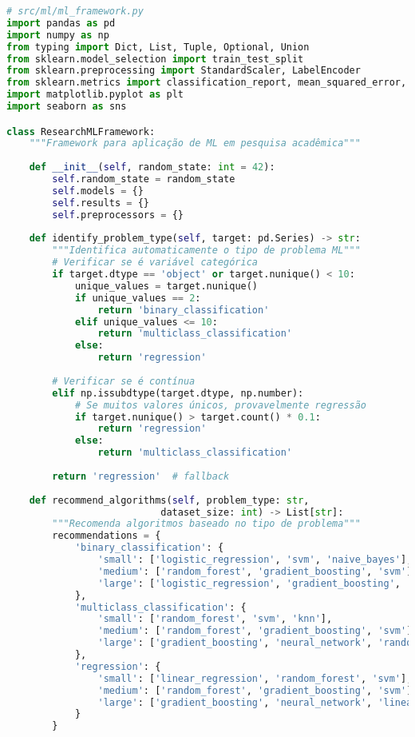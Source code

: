 \begin{pythonbox}
\begin{lstlisting}[language=Python]
# src/ml/ml_framework.py
import pandas as pd
import numpy as np
from typing import Dict, List, Tuple, Optional, Union
from sklearn.model_selection import train_test_split
from sklearn.preprocessing import StandardScaler, LabelEncoder
from sklearn.metrics import classification_report, mean_squared_error, r2_score
import matplotlib.pyplot as plt
import seaborn as sns

class ResearchMLFramework:
    """Framework para aplicação de ML em pesquisa acadêmica"""
    
    def __init__(self, random_state: int = 42):
        self.random_state = random_state
        self.models = {}
        self.results = {}
        self.preprocessors = {}
        
    def identify_problem_type(self, target: pd.Series) -> str:
        """Identifica automaticamente o tipo de problema ML"""
        # Verificar se é variável categórica
        if target.dtype == 'object' or target.nunique() < 10:
            unique_values = target.nunique()
            if unique_values == 2:
                return 'binary_classification'
            elif unique_values <= 10:
                return 'multiclass_classification'
            else:
                return 'regression'
        
        # Verificar se é contínua
        elif np.issubdtype(target.dtype, np.number):
            # Se muitos valores únicos, provavelmente regressão
            if target.nunique() > target.count() * 0.1:
                return 'regression'
            else:
                return 'multiclass_classification'
        
        return 'regression'  # fallback
    
    def recommend_algorithms(self, problem_type: str, 
                           dataset_size: int) -> List[str]:
        """Recomenda algoritmos baseado no tipo de problema"""
        recommendations = {
            'binary_classification': {
                'small': ['logistic_regression', 'svm', 'naive_bayes'],
                'medium': ['random_forest', 'gradient_boosting', 'svm'],
                'large': ['logistic_regression', 'gradient_boosting', 'neural_network']
            },
            'multiclass_classification': {
                'small': ['random_forest', 'svm', 'knn'],
                'medium': ['random_forest', 'gradient_boosting', 'svm'],
                'large': ['gradient_boosting', 'neural_network', 'random_forest']
            },
            'regression': {
                'small': ['linear_regression', 'random_forest', 'svm'],
                'medium': ['random_forest', 'gradient_boosting', 'svm'],
                'large': ['gradient_boosting', 'neural_network', 'linear_regression']
            }
        }
        

\end{lstlisting}
\end{pythonbox}
